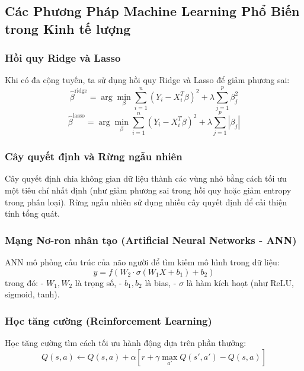 \subsection{Các Phương Pháp Machine Learning Phổ Biến trong Kinh tế lượng}
\subsubsection{Hồi quy Ridge và Lasso}
Khi có đa cộng tuyến, ta sử dụng hồi quy Ridge và Lasso để giảm phương sai:
\begin{equation}
    \hat{\beta}^{\text{ridge}} = \arg\min_\beta \sum_{i=1}^{n} (Y_i - X_i^T \beta)^2 + \lambda \sum_{j=1}^{p} \beta_j^2
\end{equation}
\begin{equation}
    \hat{\beta}^{\text{lasso}} = \arg\min_\beta \sum_{i=1}^{n} (Y_i - X_i^T \beta)^2 + \lambda \sum_{j=1}^{p} |\beta_j|
\end{equation}

\subsubsection{Cây quyết định và Rừng ngẫu nhiên}
Cây quyết định chia không gian dữ liệu thành các vùng nhỏ bằng cách tối ưu một tiêu chí nhất định (như giảm phương sai trong hồi quy hoặc giảm entropy trong phân loại).
Rừng ngẫu nhiên sử dụng nhiều cây quyết định để cải thiện tính tổng quát.

\subsubsection{Mạng Nơ-ron nhân tạo (Artificial Neural Networks - ANN)}
ANN mô phỏng cấu trúc của não người để tìm kiếm mô hình trong dữ liệu:
\begin{equation}
    y = f(W_2 \cdot \sigma(W_1 X + b_1) + b_2)
\end{equation}
trong đó:
- $W_1, W_2$ là trọng số,
- $b_1, b_2$ là bias,
- $\sigma$ là hàm kích hoạt (như ReLU, sigmoid, tanh).

\subsubsection{Học tăng cường (Reinforcement Learning)}
Học tăng cường tìm cách tối ưu hành động dựa trên phần thưởng:
\begin{equation}
    Q(s, a) \leftarrow Q(s, a) + \alpha [r + \gamma \max_{a'} Q(s', a') - Q(s, a)]
\end{equation}

